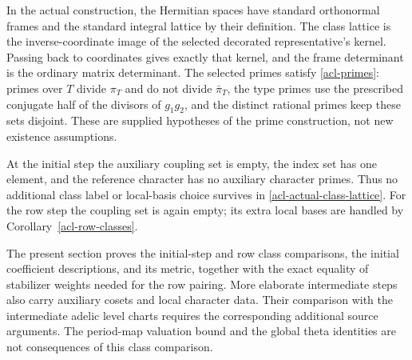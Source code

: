 In the actual construction, the Hermitian spaces have standard
orthonormal frames and the standard integral lattice by their
definition. The class lattice is the inverse-coordinate image
of the selected decorated representative's kernel. Passing back
to coordinates gives exactly that kernel, and the frame
determinant is the ordinary matrix determinant. The selected
primes satisfy \eqref{acl-primes}: primes over $T$ divide
$\pi_T$ and do not divide $\bar\pi_T$, the type primes use
the prescribed conjugate half of the divisors of $g_1g_2$,
and the distinct rational primes keep these sets disjoint.
These are supplied hypotheses of the prime construction,
not new existence assumptions.

At the initial step the auxiliary coupling set is empty, the
index set has one element, and the reference character has no
auxiliary character primes. Thus no additional class label or
local-basis choice survives in \eqref{acl-actual-class-lattice}.
For the row step the coupling set is again empty; its extra
local bases are handled by Corollary~\ref{acl-row-classes}.

The present section proves the initial-step and row class
comparisons, the initial coefficient descriptions, and its
metric, together with the exact equality of stabilizer weights
needed for the row pairing. More elaborate intermediate steps also carry auxiliary
cosets and local character data. Their comparison with the
intermediate adelic level charts requires the corresponding
additional source arguments. The period-map valuation bound
and the global theta identities are not consequences of this
class comparison.


